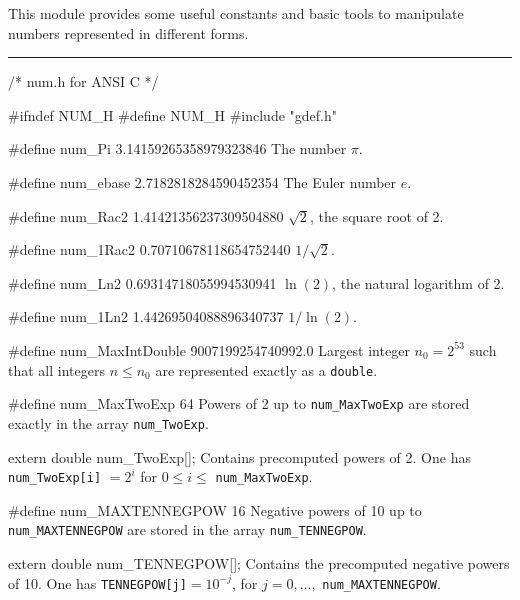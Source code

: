 
This module provides some useful constants and basic tools to 
manipulate numbers represented in different forms.

\bigskip\hrule

\code\hide
/* num.h for ANSI C */

#ifndef NUM_H
#define NUM_H
\endhide
#include "gdef.h"
\endcode

\code

#define num_Pi     3.14159265358979323846
\endcode
  \tab The number $\pi$.
  \endtab
\code

#define num_ebase  2.7182818284590452354
\endcode
  \tab The Euler number $e$.
  \endtab
\code

#define num_Rac2   1.41421356237309504880
\endcode
  \tab $\sqrt{2}$, the square root of 2.
  \endtab
\code

#define num_1Rac2  0.70710678118654752440
\endcode
  \tab $1/\sqrt{2}$.
  \endtab
\code

#define num_Ln2    0.69314718055994530941
\endcode
  \tab $\ln(2)$, the natural logarithm of 2.
  \endtab
\code

#define num_1Ln2   1.44269504088896340737
\endcode
  \tab $1 / \ln(2)$.
  \endtab
\code

#define num_MaxIntDouble   9007199254740992.0
\endcode
  \tab Largest integer $n_0 = 2^{53}$ such that all integers
  $n \le n_0$ are represented  exactly as a {\tt double}.
  \endtab


\code

#define num_MaxTwoExp   64
\endcode
  \tab Powers of 2 up to {\tt num\_MaxTwoExp} are stored exactly 
  in the array {\tt num\_TwoExp}.
  \endtab
\code

extern double num_TwoExp[];   
\endcode
  \tab  Contains precomputed powers of 2.
  One has {\tt num\_TwoExp[i]} $= 2^i$ for $0 \le i \le$ 
  {\tt num\_MaxTwoExp}.
\endtab
\code

#define num_MAXTENNEGPOW   16
\endcode
  \tab Negative powers of 10 up to {\tt num\_MAXTENNEGPOW} are stored
  in the array {\tt num\_TENNEGPOW}.
  \endtab
\code

extern double num_TENNEGPOW[];
\endcode
 \tab Contains the precomputed negative powers of 10.
   One has {\tt TENNEGPOW[j]}$ = 10^{-j}$, for $j=0,\ldots,$
 {\tt num\_MAXTENNEGPOW}.
\endtab


\code


